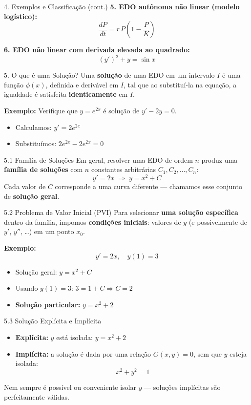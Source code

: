\documentclass[11pt, aspectratio=169]{beamer}
\begin{document}
\begin{frame}{4. Exemplos e Classificação (cont.)}
\textbf{5. EDO autônoma não linear (modelo logístico):}
\[
\frac{dP}{dt} = r\,P\!\left(1 - \frac{P}{K}\right)
\]

\textbf{6. EDO não linear com derivada elevada ao quadrado:}
\[
(y')^2 + y = \sin x
\]
\end{frame}

\begin{frame}{5. O que é uma Solução?}
Uma \textbf{solução} de uma EDO em um intervalo $I$ é uma função $\phi(x)$, definida e derivável em $I$, tal que ao substituí-la na equação, a igualdade é satisfeita \textbf{identicamente} em $I$.

\textbf{Exemplo:} Verifique que $y = e^{2x}$ é solução de $y' - 2y = 0$.
\begin{itemize}
  \item Calculamos: $y' = 2e^{2x}$
  \item Substituímos: $2e^{2x} - 2e^{2x} = 0$ \checkmark
\end{itemize}
\end{frame}

\begin{frame}{5.1 Família de Soluções}
Em geral, resolver uma EDO de ordem $n$ produz uma \textbf{família de soluções} com $n$ constantes arbitrárias $C_1, C_2, \ldots, C_n$:
\[
y' = 2x \;\Longrightarrow\; y = x^2 + C
\]
Cada valor de $C$ corresponde a uma curva diferente --- chamamos esse conjunto de \textbf{solução geral}.
\end{frame}

\begin{frame}{5.2 Problema de Valor Inicial (PVI)}
Para selecionar \textbf{uma solução específica} dentro da família, impomos \textbf{condições iniciais}: valores de $y$ (e possivelmente de $y'$, $y''$, \ldots) em um ponto $x_0$.

\textbf{Exemplo:}
\[
y' = 2x, \quad y(1) = 3
\]
\begin{itemize}
  \item Solução geral: $y = x^2 + C$
  \item Usando $y(1) = 3$: $3 = 1 + C \Rightarrow C = 2$
  \item \textbf{Solução particular:} $y = x^2 + 2$
\end{itemize}
\end{frame}

\begin{frame}{5.3 Solução Explícita e Implícita}
\begin{itemize}
  \item \textbf{Explícita:} $y$ está isolada: $y = x^2 + 2$
  \item \textbf{Implícita:} a solução é dada por uma relação $G(x, y) = 0$, sem que $y$ esteja isolada:
  \[
    x^2 + y^2 = 1
  \]
\end{itemize}
Nem sempre é possível ou conveniente isolar $y$ --- soluções implícitas são perfeitamente válidas.
\end{frame}
\end{document}
